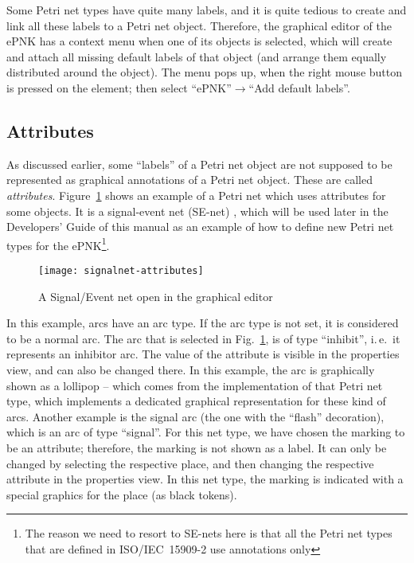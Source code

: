 Some Petri net types have quite many labels, and it is quite tedious to
create and link all these labels to a Petri net object. Therefore, the
graphical editor of the ePNK has a context menu when one of its objects
is selected, which will create and attach all missing default labels of that
object (and arrange them equally distributed around the object). The menu
pops up, when the right mouse button is pressed on the element; then select
``ePNK''$\rightarrow$``Add default labels''.%

\subsection{Attributes}
\label{subsec:attributes}

As discussed earlier, some ``labels'' of a Petri net object are not
supposed to be represented as graphical annotations of a Petri net object.
These are called \emph{attributes}.  Figure~\ref{fig:signal-net-attributes}
shows an example of a Petri net which uses attributes for some objects. It
is a signal-event net (SE-net)%
\cite{StHa97}, which will be used later in the
Developers' Guide of this manual as an example of how to define new Petri net
types for the ePNK\footnote
  {The reason we need to resort to SE-nets here is that all the Petri net types
   that are defined in ISO/IEC~15909-2 use annotations only}. 

\begin{figure}[hbt!!]
  \centerline{\texttt{[image: signalnet-attributes]}}
  \caption{A Signal/Event net open in the graphical editor}
  \label{fig:signal-net-attributes}
\end{figure}

In this example, arcs have an arc type. If the arc type is not set, it is
considered to be a normal arc. The arc that is selected in
Fig.~\ref{fig:signal-net-attributes}, is of type ``inhibit'', i.\,e.\ it
represents an inhibitor arc. The value of the attribute is visible in
the properties view, and can also be changed there. In this example,
the arc is graphically shown as a lollipop -- which comes from the
implementation of that Petri net type, which implements a dedicated
graphical representation for these kind of arcs. Another
example is the signal arc (the one with the ``flash'' decoration), which is an
arc of type ``signal''. For this net type, we have chosen the marking to be an
attribute; therefore, the marking is not shown as a label. It can only be
changed by selecting the respective place, and then changing the
respective attribute in the properties view. In this net type, the marking
is indicated with a special graphics for the place (as black tokens).


